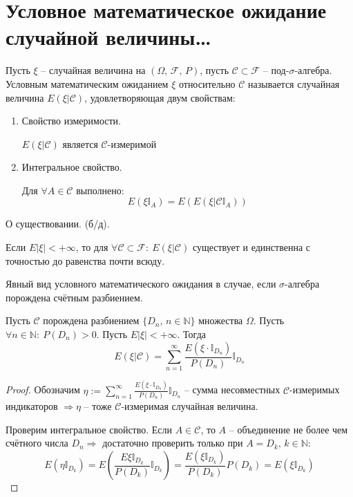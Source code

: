 \section{Условное математическое ожидание случайной величины\dots}
\begin{definition}
	Пусть $\xi$ -- случайная величина на $(\Omega,\, \mathcal{F},\, P)$, пусть $\mathcal{C} \subset \mathcal{F}$ -- под-$\sigma$-алгебра. Условным математическим ожиданием $\xi$ относительно $\mathcal{C}$ называется случайная величина $E(\xi | \mathcal{C})$, удовлетворяющая двум свойствам:
	\begin{enumerate}
		\item Свойство измеримости.

		      $E(\xi | \mathcal{C})$ является $\mathcal{C}$-измеримой
		\item Интегральное свойство.

		      Для $\forall A \in \mathcal{C}$ выполнено:
		      \[E(\xi\mathbb{I}_A) = E(E(\xi | \mathcal{C}\mathbb{I}_A))\]
	\end{enumerate}
\end{definition}

\begin{theorem}
	О существовании. (б/д).

	Если $E|\xi| < +\infty$, то для $\forall \mathcal{C} \subset \mathcal{F}:\: E(\xi | \mathcal{C})$ существует и единственна с точностью до равенства почти всюду.
\end{theorem}

\begin{lemma}
	Явный вид условного математического ожидания в случае, если $\sigma$-алгебра порождена счётным разбиением.

	Пусть $\mathcal{C}$ порождена разбиением $\{D_n,\, n \in \mathbb{N}\}$ множества $\Omega$. Пусть $\forall n \in \mathbb{N}:\: P(D_n) > 0$. Пусть $E|\xi| < +\infty$. Тогда
	\[E(\xi | \mathcal{C}) = \sum_{n = 1}^\infty\frac{E(\xi\cdot\mathbb{I}_{D_n})}{P(D_n)}\mathbb{I}_{D_n}\]
\end{lemma}

\begin{proof}
	Обозначим $\eta := \sum_{n = 1}^\infty\frac{E(\xi\cdot\mathbb{I}_{D_n})}{P(D_n)}\mathbb{I}_{D_n}$ -- сумма несовместных $\mathcal{C}$-измеримых индикаторов $\Rightarrow \eta$ -- тоже $\mathcal{C}$-измеримая случайная величина.

	Проверим интегральное свойство. Если $A \in \mathcal{C}$, то $A$ -- объединение не более чем счётного числа $D_n \Rightarrow$ достаточно проверить только при $A = D_k,\, k \in \mathbb{N}$:
	\[E(\eta\mathbb{I}_{D_k}) = E\left(\frac{E\xi\mathbb{I}_{D_k}}{P(D_k)}\mathbb{I}_{D_k}\right) = \frac{E(\xi\mathbb{I}_{D_k})}{P(D_k)}P(D_k) = E(\xi\mathbb{I}_{D_k})\]
\end{proof}
